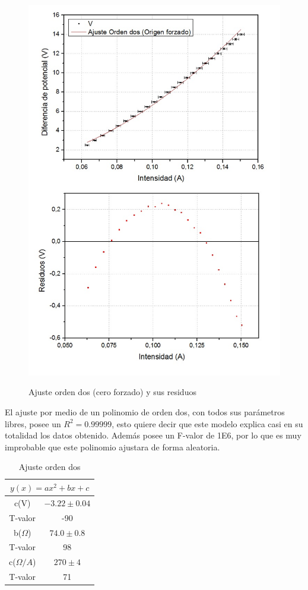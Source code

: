 \documentclass[twoside,twocolumn,a4paper]{article}
\begin{document}
\begin{figure}[h!]
\includegraphics[width=\linewidth]{fig_o2cero.jpg}
\label{fig:o2}
\caption{Ajuste orden dos (cero forzado) y sus residuos}
\label{fig:o2cero}
\end{figure}

El ajuste por medio de un polinomio de orden dos, con todos sus par\'ametros libres, posee un $R^2=0.99999$, esto quiere decir que este modelo explica casi en su totalidad los datos obtenido. Adem\'as posee un F-valor de 1E6, por lo que es muy improbable que este polinomio ajustara de forma aleatoria.\par

\begin{table}[h!]
\centering
\caption{Ajuste orden dos}
\label{tab:o2}
\begin{tabular}{|c|c|}
\hline
\multicolumn{2}{|c|}{$y(x)=ax^2+bx+c$} \\ \hline
c(V)           & $-3.22\pm0.04$        \\ \hline
T-valor        & -90                   \\ \hline
b($\Omega$)     & $74.0\pm0.8$          \\ \hline
T-valor        & 98                    \\ \hline
c($\Omega/A$)  & $270\pm4$             \\ \hline
T-valor        & 71                    \\ \hline
\end{tabular}
\end{table}
\end{document}
